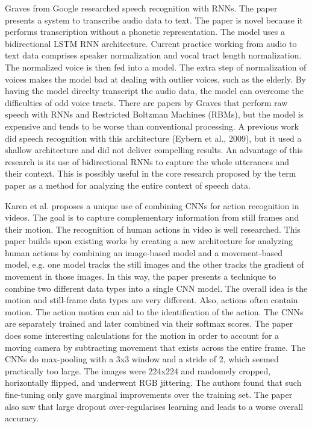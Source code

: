Graves from Google researched speech recognition with RNNs.  The paper presents a system to transcribe audio data to text.  The paper is novel because it performs transcription without a phonetic representation.  The model uses a bidirectional LSTM RNN architecture.  Current practice working from audio to text data comprises speaker normalization and vocal tract length normalization.  The normalized voice is then fed into a model.  The extra step of normalization of voices makes the model bad at dealing with outlier voices, such as the elderly.  By having the model direclty transcript the audio data, the model can overcome the difficulties of odd voice tracts.  There are papers by Graves that perform raw speech with RNNs and Restricted Boltzman Machines (RBMs), but the model is expensive and tends to be worse than conventional processing.  A previous work did speech recognition with this architecture (Eybern et al., 2009), but it used a shallow architecture and did not deliver compelling results. An advantage of this research is its use of bidirectional RNNs to capture the whole utterances and their context.  This is possibly useful in the core research proposed by the term paper as a method for analyzing the entire context of speech data.

Karen et al. proposes a unique use of combining CNNs for action recognition in videos.  The goal is to capture complementary information from still frames and their motion. The recognition of human actions in video is well researched.  This paper builds upon existing works by creating a new architecture for analyzing human actions by combining an image-based model and a movement-based model, e.g. one model tracks the still images and the other tracks the gradient of movement in those images.  In this way, the paper presents a technique to combine two different data types into a single CNN model.  The overall idea is the motion and still-frame data types are very different. Also, actions often contain motion.  The action motion can aid to the identification of the action.  The CNNs are separately trained and later combined via their softmax scores.  The paper does some interesting calculations for the motion in order to account for a moving camera by subtracting movement that exists across the entire frame.  The CNNs do max-pooling with a 3x3 window and a stride of 2, which seemed practically too large.  The images were 224x224 and randomely cropped, horizontally flipped, and underwent RGB jittering.  The authors found that such fine-tuning only gave marginal improvements over the training set.  The paper also saw that large dropout over-regularises learning and leads to a worse overall accuracy.


